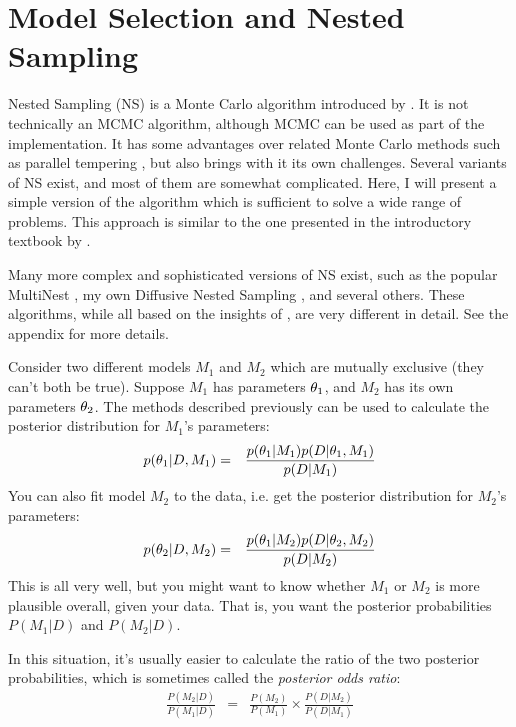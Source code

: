 \section{Model Selection and Nested Sampling}\label{sec:model_selection}
Nested Sampling (NS) is a Monte Carlo algorithm introduced by \citet{skilling}. It
is not technically an MCMC algorithm, although MCMC can be used as part of the
implementation. It has some advantages over related Monte Carlo methods
such as parallel tempering \citep{pt, gregory, tempering}, but
also brings with it its own challenges.
Several variants of NS exist, and most of them are somewhat
complicated. Here, I will present a simple version of the algorithm which
is sufficient to solve a wide range of problems. This approach is similar to
the one presented in the introductory textbook by \citet{sivia}.

Many more complex and sophisticated versions of
NS exist, such as the popular MultiNest \citep{multinest},
my own Diffusive Nested Sampling \citep{dnest}, and several others. These
algorithms, while all based on the insights of \citet{skilling}, are very
different in detail. See the appendix for more details.

Consider two different models $M_1$ and $M_2$ which are mutually exclusive
(they can't both be true).
Suppose $M_1$ has parameters
$\theta_1$, and $M_2$ has its own parameters $\theta_2$. The methods
described previously can be used to calculate the posterior distribution for
$M_1$'s parameters:
\begin{eqnarray}
p(\theta_1 | D, M_1) &=& \frac{p(\theta_1 | M_1)p(D | \theta_1, M_1)}
{p(D | M_1)}
\end{eqnarray}
You can also fit model $M_2$ to the data, i.e. get the posterior distribution
for $M_2$'s parameters:
\begin{eqnarray}
p(\theta_2 | D, M_2) &=& \frac{p(\theta_1 | M_2)p(D | \theta_2, M_2)}
{p(D | M_2)}
\end{eqnarray}
This is all very well, but you might want to know whether $M_1$ or $M_2$ is
more plausible overall, given your data. That is, you want the posterior
probabilities $P(M_1 | D)$ and $P(M_2 | D)$.

In this situation, it's usually easier to calculate the ratio of the two
posterior probabilities, which is sometimes called the {\it posterior odds
ratio}:
\begin{eqnarray}
\frac{P(M_2 | D)}{P(M_1 | D)} &=& \frac{P(M_2)}{P(M_1)}
\times \frac{P(D | M_2)}{P(D | M_1)}\label{eq:odds}
\end{eqnarray}

